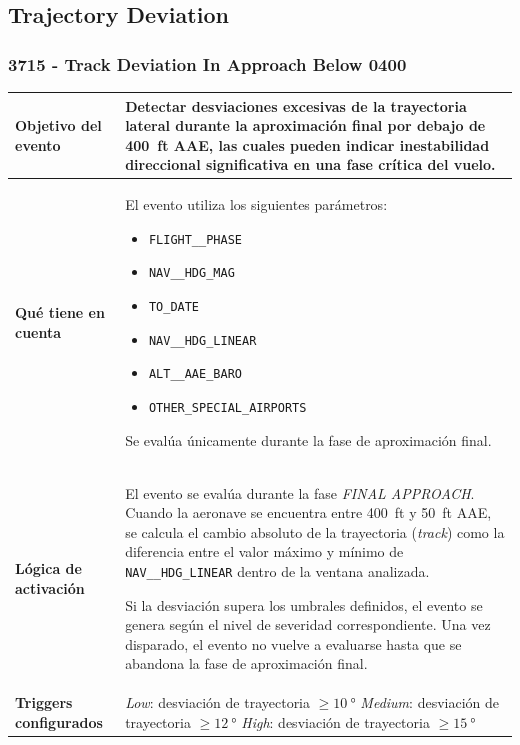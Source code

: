 \documentclass[11pt,a4paper]{article}
\begin{document}
	\subsection{Trajectory Deviation}
	
	\subsubsection{3715 - Track Deviation In Approach Below 0400}
	
	\begin{longtable}{p{5cm} p{9.5cm}}
		\hline
		\textbf{Objetivo del evento} &
		Detectar desviaciones excesivas de la trayectoria lateral durante la aproximación final por debajo de \SI{400}{ft} AAE, las cuales pueden indicar inestabilidad direccional significativa en una fase crítica del vuelo. \\
		\hline
		
		\textbf{Qué tiene en cuenta} &
		El evento utiliza los siguientes parámetros:
		\begin{itemize}
			\item \texttt{FLIGHT\_\_PHASE}
			\item \texttt{NAV\_\_HDG\_MAG}
			\item \texttt{TO\_DATE}
			\item \texttt{NAV\_\_HDG\_LINEAR}
			\item \texttt{ALT\_\_AAE\_BARO}
			\item \texttt{OTHER\_SPECIAL\_AIRPORTS}
		\end{itemize}
		Se evalúa únicamente durante la fase de aproximación final. \\
		\hline
		
		\textbf{Lógica de activación} &
		El evento se evalúa durante la fase \textit{FINAL APPROACH}.  
		Cuando la aeronave se encuentra entre \SI{400}{ft} y \SI{50}{ft} AAE, se calcula el cambio absoluto de la trayectoria (\textit{track}) como la diferencia entre el valor máximo y mínimo de \texttt{NAV\_\_HDG\_LINEAR} dentro de la ventana analizada.
		
		Si la desviación supera los umbrales definidos, el evento se genera según el nivel de severidad correspondiente.  
		Una vez disparado, el evento no vuelve a evaluarse hasta que se abandona la fase de aproximación final. \\
		\hline
		
		\textbf{Triggers configurados} &
		\textit{Low}: desviación de trayectoria $\geq \SI{10}{\degree}$ \newline
		\textit{Medium}: desviación de trayectoria $\geq \SI{12}{\degree}$ \newline
		\textit{High}: desviación de trayectoria $\geq \SI{15}{\degree}$ \\
		\hline
		

\end{longtable}
\end{document}
